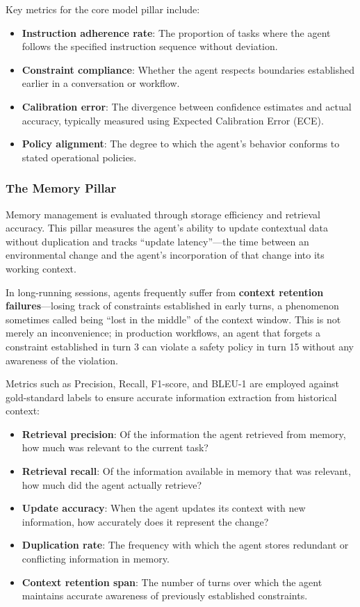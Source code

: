 \documentclass[11pt]{article}
\newcommand{\keyword}[1]{\textbf{#1}}
\begin{document}
Key metrics for the core model pillar include:
\begin{itemize}
    \item \textbf{Instruction adherence rate}: The proportion of tasks where the agent follows the specified instruction sequence without deviation.
    \item \textbf{Constraint compliance}: Whether the agent respects boundaries established earlier in a conversation or workflow.
    \item \textbf{Calibration error}: The divergence between confidence estimates and actual accuracy, typically measured using Expected Calibration Error (ECE).
    \item \textbf{Policy alignment}: The degree to which the agent's behavior conforms to stated operational policies.
\end{itemize}

\subsubsection{The Memory Pillar}

Memory management is evaluated through storage efficiency and retrieval accuracy. This pillar measures the agent's ability to update contextual data without duplication and tracks ``update latency''---the time between an environmental change and the agent's incorporation of that change into its working context.

In long-running sessions, agents frequently suffer from \keyword{context retention failures}---losing track of constraints established in early turns, a phenomenon sometimes called being ``lost in the middle'' of the context window. This is not merely an inconvenience; in production workflows, an agent that forgets a constraint established in turn 3 can violate a safety policy in turn 15 without any awareness of the violation.

Metrics such as Precision, Recall, F1-score, and BLEU-1 are employed against gold-standard labels to ensure accurate information extraction from historical context:
\begin{itemize}
    \item \textbf{Retrieval precision}: Of the information the agent retrieved from memory, how much was relevant to the current task?
    \item \textbf{Retrieval recall}: Of the information available in memory that was relevant, how much did the agent actually retrieve?
    \item \textbf{Update accuracy}: When the agent updates its context with new information, how accurately does it represent the change?
    \item \textbf{Duplication rate}: The frequency with which the agent stores redundant or conflicting information in memory.
    \item \textbf{Context retention span}: The number of turns over which the agent maintains accurate awareness of previously established constraints.
\end{itemize}
\end{document}
